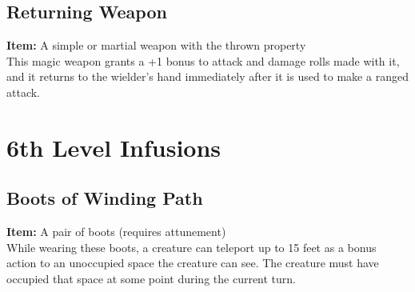 \documentclass[11pt, A4paper, english]{article}
\begin{document}
		\subsection{Returning Weapon}
\textbf{Item:} A simple or martial weapon with the thrown property \\
This magic weapon grants a +1 bonus to attack and damage rolls made with it, and it returns to the wielder's hand immediately after it is used to make a ranged attack.



	\section{6th Level Infusions}
		\subsection{Boots of Winding Path}
\textbf{Item:} A pair of boots (requires attunement) \\
While wearing these boots, a creature can teleport up to 15 feet as a bonus action to an unoccupied space the creature can see. The creature must have occupied that space at some point during the current turn.
\end{document}
